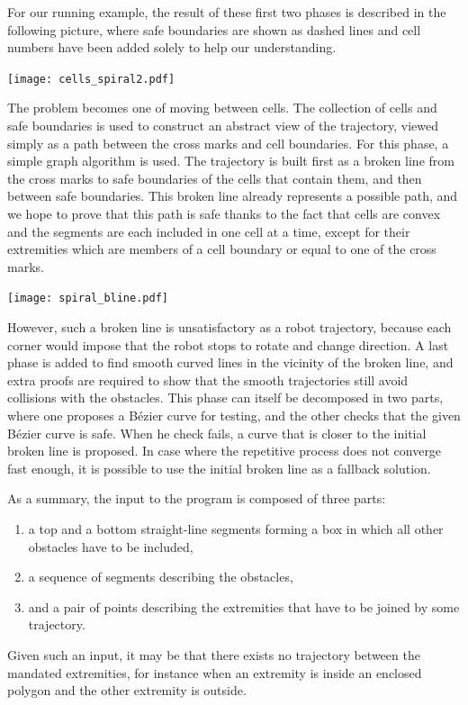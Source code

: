 \documentclass{easychair}
\begin{document}
For our running example, the result of these first two phases is
described in the following picture, where safe boundaries are shown as
dashed lines and cell numbers have been added solely to help our
understanding.
\begin{center}
\texttt{[image: cells\_spiral2.pdf]}
\end{center}
The problem becomes one of moving between cells. The collection of cells and
safe boundaries is used to
construct an abstract view of the trajectory, viewed simply as a path
between the cross marks and cell boundaries.  For this phase, a simple
graph algorithm is
used.  The trajectory is built first as a broken line from the
cross marks to safe boundaries of the cells that contain them, and then
between safe boundaries.  This broken line already represents a possible
path, and we hope to prove that this path is safe thanks to the fact
that cells are convex and the segments are each included in one
cell at a time, except for their extremities which are members of a cell
boundary or equal to one of the cross marks.
\begin{center}
\texttt{[image: spiral\_bline.pdf]}
\end{center}
However, such a broken line is unsatisfactory
as a robot trajectory, because each corner would impose that the robot
stops to rotate and change direction.  A last phase is added to find
smooth curved lines in the vicinity of the broken line, and extra proofs are
required to show that the smooth trajectories still avoid collisions with
the obstacles.  This phase can itself be decomposed in two parts, where one
proposes a Bézier curve for testing, and the other checks that the given
Bézier curve is safe.  When he check fails, a curve that is closer
to the initial broken line is proposed.  In case where the repetitive process
does not converge fast enough, it is possible to use the initial broken line as
a fallback solution.

As a summary, the input to the program is composed of three parts:
\begin{enumerate}
\item a top and a bottom straight-line segments forming a box in
which all other obstacles have to be included,
\item a sequence of segments describing the obstacles,
\item and a pair of points describing the extremities that have to be
joined by some trajectory.
\end{enumerate}
Given such an input, it may be that there exists no trajectory between
the mandated extremities, for instance when an extremity is inside
an enclosed polygon and the other extremity is outside.
\end{document}
